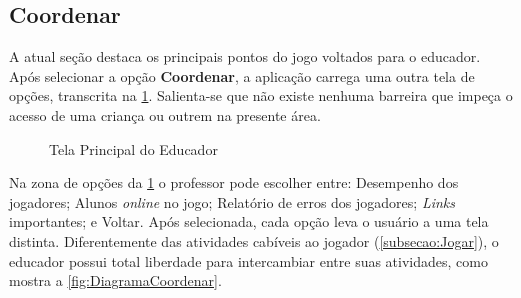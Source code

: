 \documentclass[alpha-refs,brazilian]{RBCA_v2.0}
\begin{document}
\subsection{Coordenar}\label{subsecao:Coordenar}

A atual seção destaca os principais pontos do jogo voltados para o educador. Após selecionar a opção \textbf{Coordenar}, a aplicação carrega uma outra tela de opções, transcrita na \cref{fig:PrincipalCoordenar}. Salienta-se que não existe nenhuma barreira que impeça o acesso de uma criança ou outrem na presente área.

\begin{figure}[h]
  \centering
  \caption{Tela Principal do Educador}
  \label{fig:PrincipalCoordenar}
\end{figure} 

Na zona de opções da \cref{fig:PrincipalCoordenar} o professor pode escolher entre: Desempenho dos jogadores; Alunos \textit{online} no jogo; Relatório de erros dos jogadores; \textit{Links} importantes; e Voltar. Após selecionada, cada opção leva o usuário a uma tela distinta. Diferentemente das atividades cabíveis ao jogador (\cref{subsecao:Jogar}), o educador possui total liberdade para intercambiar entre suas atividades, como mostra a \cref{fig:DiagramaCoordenar}.
 
\end{document}
